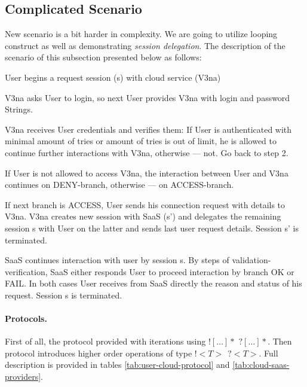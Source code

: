 \documentclass[a4paper]{easychair}
\begin{document}
\subsection{Complicated Scenario}
New scenario is a bit harder in complexity. We are going to utilize looping construct as well as demonstrating \textit{session delegation}. The description of the scenario of this subsection presented below as follows:
\begin{compactenum}
\item  User begins a request session (s) with cloud service (V3na)

\item  V3na asks User to login, so next User provides V3na with login and password Strings.

\item  V3na receives User credentials and verifies them: If User is authenticated with minimal amount of tries or amount of tries is out of limit, he is allowed to continue further interactions with V3na, otherwise --- not. Go back to step 2.

\item  If User is not allowed to access V3na, the interaction between User and V3na continues on DENY-branch, otherwise --- on ACCESS-branch.

\item  If next branch is ACCESS, User sends his connection request with details to V3na. V3na creates new session with SaaS (s') and delegates the remaining session s with User on the latter and sends last user request details. Session s' is terminated.

\item  SaaS continues interaction with user by session s. By steps of validation-verification, SaaS either responds User to proceed interaction by branch OK or FAIL. In both cases User receives from SaaS directly the reason and status of his request. Session s is terminated.
\end{compactenum}

\paragraph{Protocols.} First of all, the protocol provided with iterations using $![\dots]*$ $?[\dots]*$. Then protocol introduces higher order operations of type $!<T>\ \ ?<T>$. Full description is provided in tables \ref{tab:user-cloud-protocol} and \ref{tab:cloud-saas-providers}.
\end{document}
